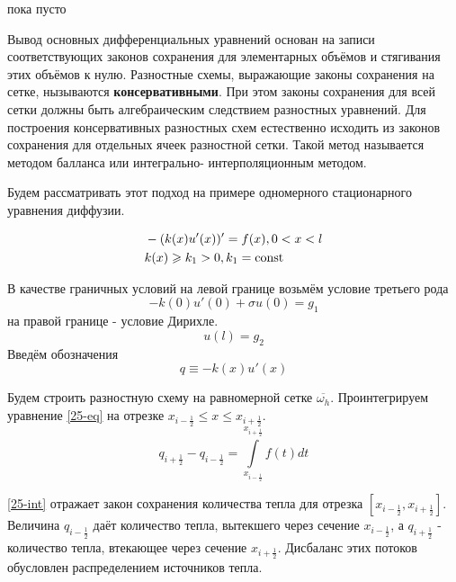 \begin{col-answer-preambule}
	\begin{plan}
    \item пока пусто
	\end{plan}
\end{col-answer-preambule}


Вывод основных дифференциальных уравнений основан на записи соответствующих
законов сохранения для элементарных объёмов и стягивания этих объёмов к нулю.
Разностные схемы, выражающие законы сохранения на сетке, нызываются
\textbf{консервативными}. При этом законы сохранения для всей сетки должны быть
алгебраическим следствием разностных уравнений. Для построения консервативных
разностных схем естественно исходить из законов сохранения для отдельных ячеек
разностной сетки. Такой метод называется методом балланса или интегрально-
интерполяционным методом.

Будем рассматривать этот подход на примере одномерного стационарного уравнения диффузии.

\begin{align}
  \label{25-eq}
  &-(k(x)u'(x))' = f(x), 0 < x < l\\
  \nonumber
  &k(x) \geqslant k_1 > 0, k_1 = \operatorname{\text{const}}
\end{align}

В качестве граничных условий на левой границе возьмём условие третьего рода
\begin{equation}
  \label{25-initial}
  -k(0)u'(0) + \sigma u(0) = g_1
\end{equation}
на правой границе - условие Дирихле.
\begin{equation}
  u(l) = g_2
\end{equation}
Введём обозначения
\begin{equation}
  q \equiv -k(x)u'(x)
\end{equation}

Будем строить разностную схему на равномерной сетке $\overline{\omega_h}$.
Проинтегрируем
уравнение \eqref{25-eq} на отрезке $x_{i - \frac{1}{2}} \leqslant x
\leqslant x_{i + \frac{1}{2}}$.
\begin{equation}
  \label{25-int}
  q_{i + \frac{1}{2}} - q_{i - \frac{1}{2}} = \int\limits_{x_{i - \frac{1}{2}}}^
  {x_{i + \frac{1}{2}}}f(t)dt
\end{equation}

\eqref{25-int} отражает закон сохранения количества тепла для отрезка
$[x_{i - \frac{1}{2}}, x_{i + \frac{1}{2}}]$. Величина $q_{i - \frac{1}{2}}$ даёт
количество тепла, вытекшего через сечение $x_{i - \frac{1}{2}}$, а $q_{i +\frac{1}{2}}$
- количество тепла, втекающее через сечение $x_{i + \frac{1}{2}}$. Дисбаланс этих
потоков обусловлен распределением источников тепла.

